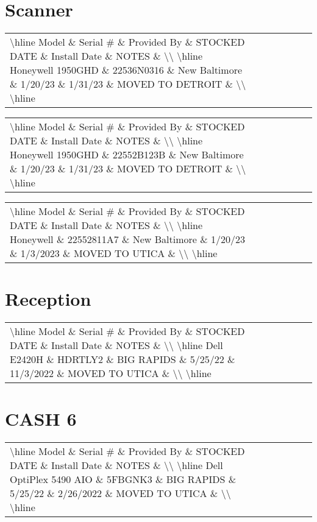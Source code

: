 \documentclass{article}%
\begin{document}
\section{Scanner}%
\label{sec:Scanner}%
\begin{tabularx}{\textwidth}{|X|X|X|X|X|X|X|}%
\textbackslash{}hline%
Model \& Serial \# \& Provided By \& STOCKED DATE \& Install Date \& NOTES \&  \textbackslash{}\textbackslash{}%
\textbackslash{}hline%
Honeywell 1950GHD \& 22536N0316 \& New Baltimore \& 1/20/23 \& 1/31/23 \& MOVED TO DETROIT \&  \textbackslash{}\textbackslash{}%
\textbackslash{}hline%
\end{tabularx}%
\begin{tabularx}{\textwidth}{|X|X|X|X|X|X|X|}%
\textbackslash{}hline%
Model \& Serial \# \& Provided By \& STOCKED DATE \& Install Date \& NOTES \&  \textbackslash{}\textbackslash{}%
\textbackslash{}hline%
Honeywell 1950GHD \& 22552B123B \& New Baltimore \& 1/20/23 \& 1/31/23 \& MOVED TO DETROIT \&  \textbackslash{}\textbackslash{}%
\textbackslash{}hline%
\end{tabularx}%
\begin{tabularx}{\textwidth}{|X|X|X|X|X|X|X|}%
\textbackslash{}hline%
Model \& Serial \# \& Provided By \& STOCKED DATE \& Install Date \& NOTES \&  \textbackslash{}\textbackslash{}%
\textbackslash{}hline%
Honeywell \& 22552811A7 \& New Baltimore \& 1/20/23 \& 1/3/2023 \& MOVED TO UTICA \&  \textbackslash{}\textbackslash{}%
\textbackslash{}hline%
\end{tabularx}

%
\section{Reception}%
\label{sec:Reception}%
\begin{tabularx}{\textwidth}{|X|X|X|X|X|X|X|}%
\textbackslash{}hline%
Model \& Serial \# \& Provided By \& STOCKED DATE \& Install Date \& NOTES \&  \textbackslash{}\textbackslash{}%
\textbackslash{}hline%
Dell E2420H \& HDRTLY2 \& BIG RAPIDS \& 5/25/22 \& 11/3/2022 \& MOVED TO UTICA  \&  \textbackslash{}\textbackslash{}%
\textbackslash{}hline%
\end{tabularx}

%
\section{CASH 6}%
\label{sec:CASH6}%
\begin{tabularx}{\textwidth}{|X|X|X|X|X|X|X|}%
\textbackslash{}hline%
Model \& Serial \# \& Provided By \& STOCKED DATE \& Install Date \& NOTES \&  \textbackslash{}\textbackslash{}%
\textbackslash{}hline%
Dell OptiPlex 5490 AIO \& 5FBGNK3 \& BIG RAPIDS \& 5/25/22 \& 2/26/2022 \& MOVED TO UTICA  \&  \textbackslash{}\textbackslash{}%
\textbackslash{}hline%
\end{tabularx}
\end{document}
